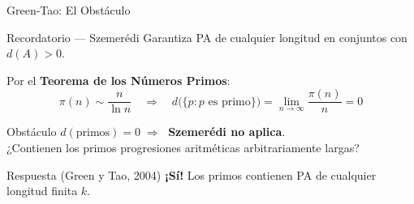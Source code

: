 
\begin{frame}{Green-Tao: El Obstáculo}

    \begin{block}{Recordatorio — Szemerédi}
        Garantiza PA de cualquier longitud en conjuntos con
        $d(A) > 0$.
    \end{block}

    \vspace{0.3cm}

    Por el \textbf{Teorema de los Números Primos}:
    \[
        \pi(n) \sim \frac{n}{\ln n}
        \quad\Longrightarrow\quad
        d\bigl(\{p : p \text{ es primo}\}\bigr)
        = \lim_{n\to\infty}\frac{\pi(n)}{n} = 0
    \]

    \pause
    \vspace{0.3cm}

    \begin{alertblock}{Obstáculo}
        $d(\text{primos}) = 0 \;\Rightarrow\;$ \textbf{Szemerédi no aplica}.\\[4pt]
        ¿Contienen los primos progresiones aritméticas
        arbitrariamente largas?
    \end{alertblock}

    \pause
    \vspace{0.3cm}

    \begin{exampleblock}{Respuesta (Green y Tao, 2004)}
        \centering
        \textbf{¡Sí!} Los primos contienen PA de cualquier
        longitud finita $k$.
    \end{exampleblock}

\end{frame}


